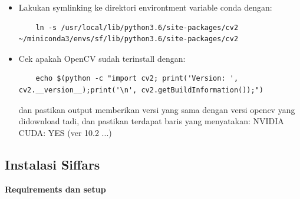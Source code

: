\begin{itemize}
  \item Lakukan symlinking ke direktori environtment variable conda dengan:
  
  \begin{lstlisting}
    ln -s /usr/local/lib/python3.6/site-packages/cv2 ~/miniconda3/envs/sf/lib/python3.6/site-packages/cv2
  \end{lstlisting}

  \item Cek apakah OpenCV sudah terinstall dengan:
  
  \begin{lstlisting}
    echo $(python -c "import cv2; print('Version: ', cv2.__version__);print('\n', cv2.getBuildInformation());")
  \end{lstlisting}

  dan pastikan output memberikan versi yang sama dengan versi opencv yang didownload tadi, dan pastikan terdapat baris yang menyatakan: NVIDIA CUDA: YES (ver 10.2 ...)

\end{itemize}

\subsection{Instalasi Siffars}
\textbf{Requirements dan setup}

